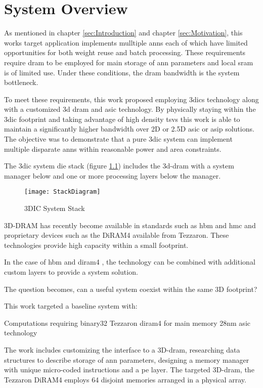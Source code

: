 



\chapter{System Overview}
\label{chap-five}
\label{sec:System Overview}
As mentioned in chapter \ref{sec:Introduction} and chapter \ref{sec:Motivation}, this works target application implements mulltiple \acp{ann} each of which have limited opportunities for both weight reuse and batch processing.
These requirements require \ac{dram} to be employed for main storage of \ac{ann} parameters and local \ac{sram} is of limited use.
Under these conditions, the \ac{dram} bandwidth is the system bottleneck.

To meet these requirements, this work proposed employing \acp{3dic} technology along with a customized \ac{3d} \ac{dram} and \ac{asic} technology. 
By physically staying within the \ac{3dic} footprint and taking advantage of high density \acp{tsv} this work is able to maintain a significantly higher bandwidth over 2D or 2.5D \ac{asic} or \ac{asip} solutions.
The objective was to demonstrate that a pure \ac{3dic} system can implement multiple disparate \acp{ann} within reasonable power and area constraints. 

The \ac{3dic} system die stack (figure \ref{fig:3DICStack}) includes the \ac{3d}-\ac{dram} with a system manager below and one or more processing layers below the manager.
\begin{figure}[!t]
\centering
\captionsetup{justification=centering}
\captionsetup{width=.9\linewidth}
\centerline{
\mbox{\texttt{[image: StackDiagram]}}
}
\caption{3DIC System Stack}
\label{fig:3DICStack}
\end{figure}

3D-DRAM has recently become available in standards such as \ac{hbm} and \ac{hmc} and proprietary devices such as the DiRAM4 available from Tezzaron. 
These technologies provide high capacity within a small footprint.

In the case of \ac{hbm} and \ac{diram4} \cite{tezzaron:diram4}, the technology can be combined with additional custom layers to provide a system solution.

The question becomes, can a useful system coexist within the same 3D footprint?

This work targeted a baseline system with:
\begin{outline}
  \1 Computations requiring \ac{binary32}
  \1 Tezzaron \acf{diram4} \cite{tezzaron:diram4} for main memory
  \1 28nm \ac{asic} technology
\end{outline}
The work includes customizing the interface to a 3D-\ac{dram}, researching data structures to describe storage of \ac{ann} parameters, designing a memory manager with unique micro-coded instructions and a \ac{pe} layer.  
The targeted 3D-\ac{dram}, the Tezzaron DiRAM4 employs 64 disjoint memories arranged in a physical array.


